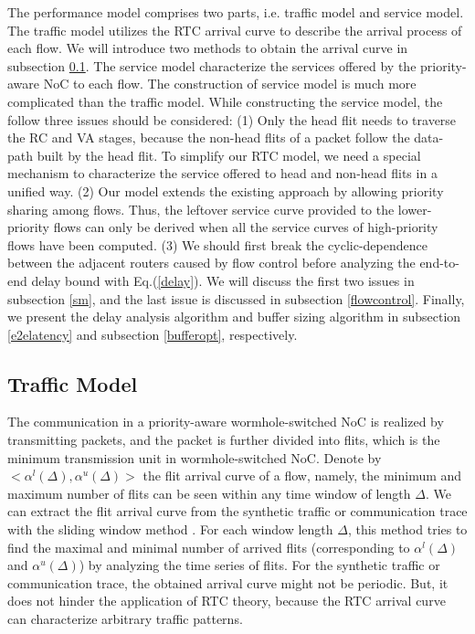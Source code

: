 \documentclass[preprint]{elsarticle}
\begin{document}
The performance model comprises two parts, i.e. traffic model and service model. The traffic model utilizes the RTC arrival curve to describe the arrival process of each flow. We will introduce two methods to obtain the arrival curve in subsection \ref{traffic}. The service model characterize the services offered by the priority-aware NoC to each flow. The construction of service model is much more complicated than the traffic model. While constructing the service model, the follow three issues should be considered: (1) Only the head flit needs to traverse the RC and VA stages, because the non-head flits of a packet follow the data-path built by the head flit. To simplify our RTC model, we need a special mechanism to characterize the service offered to head and non-head flits in a unified way. (2) Our model extends the existing approach \cite{73}\cite{Qian489900} by allowing priority sharing among flows. Thus, the leftover service curve provided to the lower-priority flows can only be derived when all the service curves of high-priority flows have been computed. (3) We should first break the cyclic-dependence between the adjacent routers caused by flow control before analyzing the end-to-end delay bound with Eq.(\ref{delay}). We will discuss the first two issues in subsection \ref{sm}, and the last issue is discussed in subsection \ref{flowcontrol}. Finally, we present the delay analysis algorithm and buffer sizing algorithm in subsection \ref{e2elatency} and subsection \ref{bufferopt}, respectively.

\subsection{Traffic Model}\label{traffic}
The communication in a priority-aware wormhole-switched NoC is realized by transmitting packets, and the packet is further divided into flits, which is the minimum transmission unit in wormhole-switched NoC. Denote by $<\alpha^l(\Delta),\alpha^u(\Delta)>$ the flit arrival curve of a flow, namely, the minimum and maximum number of flits can be seen within any time window of length $\Delta$. We can extract the flit arrival curve from the synthetic traffic or communication trace with the sliding window method \cite{1253607}. For each window length $\Delta$, this method tries to find the maximal and minimal number of arrived flits (corresponding to $\alpha^l(\Delta)$ and $\alpha^u(\Delta)$) by analyzing the time series of flits. For the synthetic traffic or communication trace, the obtained arrival curve might not be periodic. But, it does not hinder the application of RTC theory, because the RTC arrival curve can characterize arbitrary traffic patterns.
\end{document}
